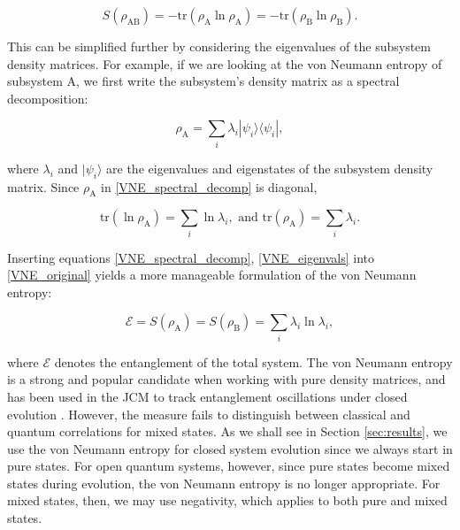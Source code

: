 \documentclass[11pt]{article}
\begin{document}
\begin{equation} \label{VNE_original}
    S(\rho_{\scriptscriptstyle \text{AB}}) = -\text{tr}(\rho_{\scriptscriptstyle \text{A}}\ln\rho_{\scriptscriptstyle \text{A}}) = -\text{tr}(\rho_{\scriptscriptstyle \text{B}}\ln\rho_{\scriptscriptstyle \text{B}}).
\end{equation}

This can be simplified further by considering the eigenvalues of the subsystem density matrices. For example, if we are looking at the von Neumann entropy of subsystem A, we first write the subsystem's density matrix as a spectral decomposition:

\begin{equation} \label{VNE_spectral_decomp}
    \rho_{\scriptscriptstyle \text{A}} = \sum_i \lambda_i|\psi_i\rangle\langle\psi_i|, 
\end{equation}

where $\lambda_i$ and $|\psi_i\rangle$ are the eigenvalues and eigenstates of the subsystem density matrix. Since $\rho_{\scriptscriptstyle \text{A}}$ in \eqref{VNE_spectral_decomp} is diagonal,

\begin{equation} \label{VNE_eigenvals}
\text{tr}(\ln\rho_{\scriptscriptstyle \text{A}}) = \sum_i \ln\lambda_i,\text{ and } \text{tr}(\rho_{\scriptscriptstyle \text{A}}) = \sum_i \lambda_i.
\end{equation}

Inserting equations \eqref{VNE_spectral_decomp}, \eqref{VNE_eigenvals} into \eqref{VNE_original} yields a more manageable formulation of the von Neumann entropy:

\begin{equation} \label{eqn:vne}
    \mathcal{E} = S(\rho_{\scriptscriptstyle \text{A}}) = S(\rho_{\scriptscriptstyle \text{B}}) = \sum_i \lambda_i\ln\lambda_i,
\end{equation}

where $\mathcal{E}$ denotes the entanglement of the total system. The von Neumann entropy is a strong and popular candidate when working with pure density matrices, and has been used in the JCM to track entanglement oscillations under closed evolution \cite{Entanglement2009-REE_VNapplied}. However, the measure fails to distinguish between classical and quantum correlations for mixed states. As we shall see in Section \ref{sec:results}, we use the von Neumann entropy for closed system evolution since we always start in pure states. For open quantum systems, however, since pure states become mixed states during evolution, the von Neumann entropy is no longer appropriate. For mixed states, then, we may use negativity, which applies to both pure and mixed states.
\end{document}
